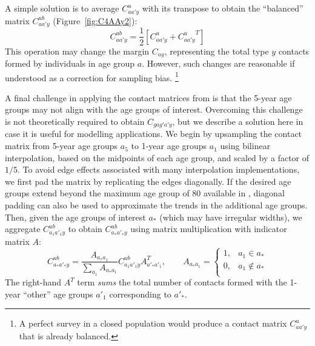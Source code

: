 A simple solution is to average $C^u_{aa'y}$ with its transpose
to obtain the ``balanced'' matrix $C^{ub}_{aa'y}$ (Figure~\ref{fig:C4AAy2}):
\begin{equation}\label{eq:C^ub}
  C^{ub}_{aa'y} = \frac{1}{2}\left[C^u_{aa'y} + {C^u_{aa'y}}^{T}\right]
\end{equation}
This operation may change the margin $C_{ay}$, representing
the total type $y$ contacts formed by individuals in age group $a$.
However, such changes are reasonable if understood as a correction for sampling bias.%
\footnote{A perfect survey in a closed population would produce
  a contact matrix $C^u_{aa'y}$ that is already balanced.}
\par
A final challenge in applying the contact matrices from \cite{Prem2021} is that
the 5-year age groups may not align with the age groups of interest.
Overcoming this challenge is not theoretically required to obtain $C_{gag'a'y}$,
but we describe a solution here in case it is useful for modelling applications.
We begin by upsampling the contact matrix from 5-year age groups $a_5$ to 1-year age groups $a_1$
using bilinear interpolation, based on the midpoints of each age group,
and scaled by a factor of $1/5$.
To avoid edge effects associated with many interpolation implementations,
we first pad the matrix by replicating the edges diagonally.
If the desired age groups extend beyond the maximum age group of 80 available in \cite{Prem2021},
diagonal padding can also be used to approximate the trends in the additional age groups.
Then, given the age groups of interest $a_*$ (which may have irregular widths),
we aggregate $C^{ub}_{a_1a'_1y}$ to obtain $C^{ub}_{a_*a'_*y}$
using matrix multiplication with indicator matrix $A$:
\begin{equation}\label{eq:Ca*}
  C^{ub}_{a_*a'_*y} = \frac{A_{a_*a_1}}{\sum_{a_1} A_{a_*a_1}} C^{ub}_{a_1a'_1y} A_{a'_*a'_1}^T,\qquad
  A_{a_*a_1} = \begin{cases}
    1, & a_1 \in a_* \\
    0, & a_1 \not\in a_* \\
  \end{cases}
\end{equation}
The right-hand $A^T$ term \textit{sums} the total number of contacts
formed with the 1-year ``other'' age groups $a'_1$ corresponding to $a'_*$.
